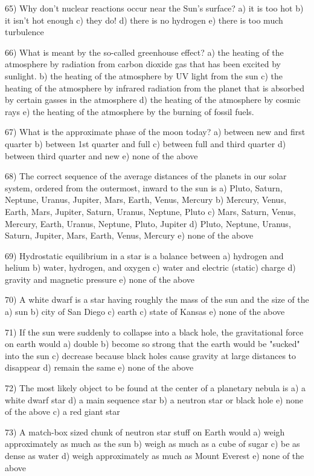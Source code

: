 65) Why don't nuclear reactions occur near the Sun's surface?
a) it is too hot b) it isn't hot enough c) they do!
d) there is no hydrogen e) there is too much turbulence

66) What is meant by the so-called greenhouse effect?
a) the heating of the atmosphere by radiation from carbon dioxide
gas that has been excited by sunlight.
b) the heating of the atmosphere by UV light from the sun
c) the heating of the atmosphere by infrared radiation from the
planet that is absorbed by certain gasses in the atmosphere
d) the heating of the atmosphere by cosmic rays
e) the heating of the atmosphere by the burning of fossil fuels.

67) What is the approximate phase of the moon today?
a) between new and first quarter
b) between 1st quarter and full
c) between full and third quarter
d) between third quarter and new
e) none of the above

68) The correct sequence of the average distances of the planets in our solar
system, ordered from the outermost, inward to the sun is
a) Pluto, Saturn, Neptune, Uranus, Jupiter, Mars, Earth, Venus, Mercury
b) Mercury, Venus, Earth, Mars, Jupiter, Saturn, Uranus, Neptune, Pluto
c) Mars, Saturn, Venus, Mercury, Earth, Uranus, Neptune, Pluto, Jupiter
d) Pluto, Neptune, Uranus, Saturn, Jupiter, Mars, Earth, Venus, Mercury
e) none of the above

69) Hydrostatic equilibrium in a star is a balance between
a) hydrogen and helium
b) water, hydrogen, and oxygen
c) water and electric (static) charge
d) gravity and magnetic pressure
e) none of the above

70) A white dwarf is a star having roughly the mass of the sun
and the size of the
a) sun b) city of San Diego c) earth c) state of Kansas
e) none of the above

71) If the sun were suddenly to collapse into a black hole,
the gravitational force on earth would
a) double
b) become so strong that the earth would be "sucked" into the sun
c) decrease because black holes cause gravity at large distances
to disappear
d) remain the same
e) none of the above

72) The most likely object to be found at the center of a planetary nebula is
a) a white dwarf star d) a main sequence star
b) a neutron star or black hole e) none of the above
c) a red giant star

73) A match-box sized chunk of neutron star stuff on Earth would
a) weigh approximately as much as the sun
b) weigh as much as a cube of sugar
c) be as dense as water
d) weigh approximately as much as Mount Everest
e) none of the above

